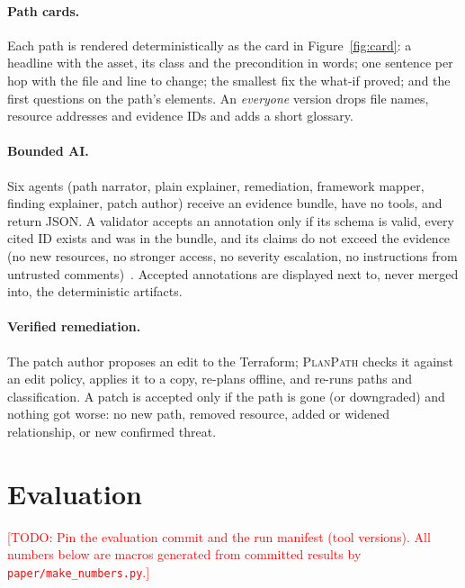 \documentclass[sigconf,review,anonymous]{acmart}
\newcommand{\sys}{\textsc{PlanPath}\xspace}   %
\newcommand{\todo}[1]{\textcolor{red}{[TODO: #1]}}
\begin{document}
\paragraph{Path cards.} Each path is rendered deterministically as the card in Figure~\ref{fig:card}: a headline with the
asset, its class and the precondition in words; one sentence per hop with the file and line to change; the smallest fix the
what-if proved; and the first questions on the path's elements. An \emph{everyone} version drops file names, resource
addresses and evidence IDs and adds a short glossary.

\paragraph{Bounded AI.} Six agents (path narrator, plain explainer, remediation, framework mapper, finding explainer, patch
author) receive an evidence bundle, have no tools, and return JSON. A validator accepts an annotation only if its schema is
valid, every cited ID exists and was in the bundle, and its claims do not exceed the evidence (no new resources, no stronger
access, no severity escalation, no instructions from untrusted comments)~\cite{owasp-llm01,ms2026threatai}. Accepted
annotations are displayed next to, never merged into, the deterministic artifacts.

\paragraph{Verified remediation.} The patch author proposes an edit to the Terraform; \sys checks it against an edit policy,
applies it to a copy, re-plans offline, and re-runs paths and classification. A patch is accepted only if the path is gone
(or downgraded) and nothing got worse: no new path, removed resource, added or widened relationship, or new confirmed threat.

\section{Evaluation}\label{sec:eval}

\todo{Pin the evaluation commit and the run manifest (tool versions). All numbers below are macros generated from
committed results by \texttt{paper/make\_numbers.py}.}
\end{document}
